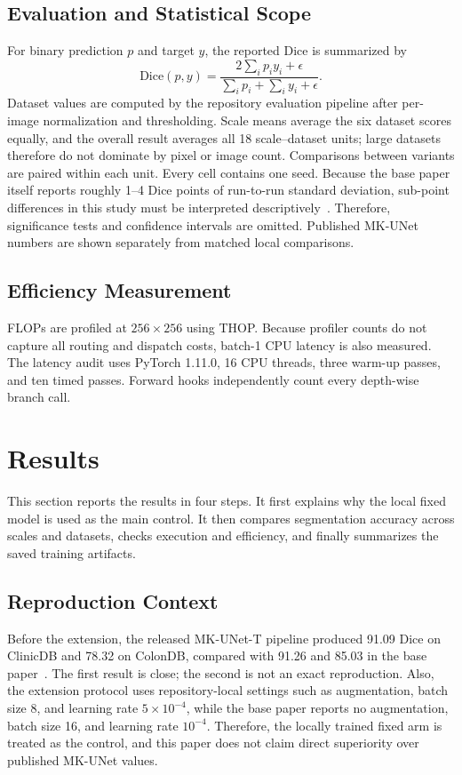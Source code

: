 \documentclass[conference]{IEEEtran}
\begin{document}
\subsection{Evaluation and Statistical Scope}
For binary prediction $p$ and target $y$, the reported Dice is summarized by
\begin{equation}
    \mathrm{Dice}(p,y)=\frac{2\sum_i p_i y_i+\epsilon}
    {\sum_i p_i+\sum_i y_i+\epsilon}.
    \label{eq:dice}
\end{equation}
Dataset values are computed by the repository evaluation pipeline after per-image normalization and thresholding. Scale means average the six dataset scores equally, and the overall result averages all 18 scale--dataset units; large datasets therefore do not dominate by pixel or image count. Comparisons between variants are paired within each unit. Every cell contains one seed. Because the base paper itself reports roughly 1--4 Dice points of run-to-run standard deviation, sub-point differences in this study must be interpreted descriptively~\cite{rahman2025mkunet}. Therefore, significance tests and confidence intervals are omitted. Published MK-UNet numbers are shown separately from matched local comparisons.

\subsection{Efficiency Measurement}
FLOPs are profiled at $256\times256$ using THOP. Because profiler counts do not capture all routing and dispatch costs, batch-1 CPU latency is also measured. The latency audit uses PyTorch 1.11.0, 16 CPU threads, three warm-up passes, and ten timed passes. Forward hooks independently count every depth-wise branch call.

\section{Results}
This section reports the results in four steps. It first explains why the local fixed model is used as the main control. It then compares segmentation accuracy across scales and datasets, checks execution and efficiency, and finally summarizes the saved training artifacts.

\subsection{Reproduction Context}
Before the extension, the released MK-UNet-T pipeline produced 91.09 Dice on ClinicDB and 78.32 on ColonDB, compared with 91.26 and 85.03 in the base paper~\cite{rahman2025mkunet}. The first result is close; the second is not an exact reproduction. Also, the extension protocol uses repository-local settings such as augmentation, batch size 8, and learning rate $5\times10^{-4}$, while the base paper reports no augmentation, batch size 16, and learning rate $10^{-4}$. Therefore, the locally trained fixed arm is treated as the control, and this paper does not claim direct superiority over published MK-UNet values.
\end{document}
